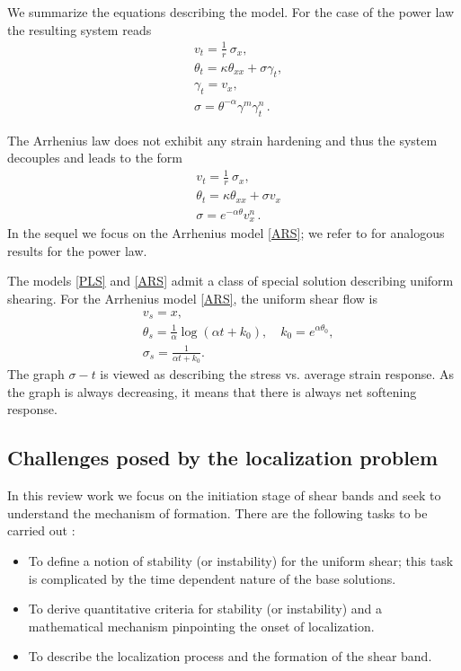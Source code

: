 \documentclass[a4paper,11pt]{article}
\newcommand{\sg}{\sigma}
\newcommand{\tht}{\theta}
\newcommand{\ga}{\alpha}
\theoremstyle{remark}
\begin{document}
We summarize the equations describing the model. For the case of the power law
the resulting system reads
\begin{equation}
  \label{PLS}
  \begin{aligned}
    & v_{t} = \frac{1}{r}\ \sigma_{x},\\
    & \theta_{t} = \kappa \theta_{ x x}  +  \sigma \gamma_{t}, \\
    & \gamma_{t} = v_{x},  \\
    & \sigma  = \theta^{-\alpha}\gamma^{m}\gamma_{t}^n \, .
  \end{aligned}
\end{equation}


The Arrhenius law does not exhibit any strain hardening and thus the system decouples and
leads to the form
\begin{equation}
  \label{ARS}
  \begin{aligned}
    & v_{t} = \frac{1}{r}\ \sigma_{x},\\
    & \theta_{t} = \kappa \theta_{ x x}  +  \sigma v_x \\
    & \sigma  = e^{-\ga\theta} v_x^n \, .
  \end{aligned}
\end{equation}
In the sequel we focus on the Arrhenius model \eqref{ARS}; we refer to \cite{KT,KT2} for analogous results
for the power law.


The models \eqref{PLS} and \eqref{ARS} admit a class of special solution describing
uniform shearing. For the Arrhenius model \eqref{ARS}, the uniform shear flow is
\begin{equation} \label{ARUSS}
\begin{aligned}
& v_s = x, \\
& \tht_s= \frac{1}{\ga} \log{\left(\ga t + k_0\right)}, \quad   k_0 = e^{\ga\tht_0},\\
& \sg_s =  \frac{1}{\ga t + k_0}.
\end{aligned}
\end{equation}
The graph $\sigma - t$  is viewed as describing the stress vs. average strain response. As the
graph is always decreasing, it means that  there is always net softening response.



\subsection{Challenges posed by the localization problem}
In this review work we focus on the initiation stage of shear bands and seek to understand the
mechanism of formation.
There are the following tasks to be carried out :
\begin{itemize}
\item To define a notion of stability (or instability) for the uniform shear; this task is complicated
by the time dependent nature of the base solutions.
\item To derive quantitative criteria for stability (or instability) and a mathematical mechanism pinpointing the onset of localization.
\item To describe the localization process and the formation of the shear band.
\end{itemize}
\end{document}

